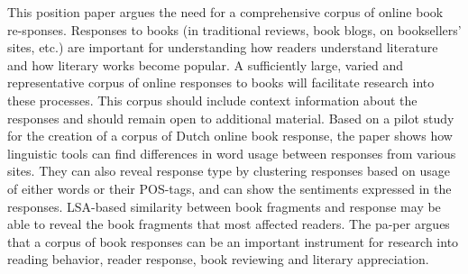 This position paper argues the need for a comprehensive corpus of online book re-sponses. Responses to books (in traditional reviews, book blogs, on
 booksellers' sites, etc.) are important for understanding how readers
 understand literature and how literary works become popular. A sufficiently
 large, varied and representative corpus of online responses to books will
 facilitate research into these processes. This corpus should include context
 information about the responses and should remain open to additional material.
 Based on a pilot study for the creation of a corpus of Dutch online book
 response, the paper shows how linguistic tools can find differences in word
 usage between responses from various sites. They can also reveal response type
 by clustering responses based on usage of either words or their POS-tags, and
 can show the sentiments expressed in the responses. LSA-based similarity
 between book fragments and response may be able to reveal the book fragments
 that most affected readers. The pa-per argues that a corpus of book responses
 can be an important instrument for research into reading behavior, reader
 response, book reviewing and literary appreciation.

